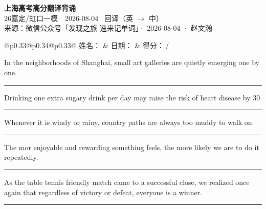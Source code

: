 \documentclass[11pt,a4paper]{article}
\newcommand{\num}[1]{\makebox[1.9em][r]{#1.}\hspace{0.3em}}
\newcommand{\wline}{\noindent\rule{\linewidth}{0.4pt}}
\begin{document}
\pagestyle{plain}
\begin{center}
{\LARGE\bfseries 上海高考高分翻译背诵 }\\[0.25em]
{\large 26嘉定/虹口一模　2026-08-04 \quad\ 回译（英 $\to$ 中）}\\[0.35em]
{\footnotesize 来源：微信公众号「发现之旅 速来记单词」· 2026-08-04 · 赵文瀚}
\end{center}

\vspace{0.4em}
\noindent\begin{tabular}{@{}p{0.33\textwidth}@{}p{0.34\textwidth}@{}p{0.33\textwidth}@{}}
姓名：\underline{\hspace{2.0cm}} & 日期：\underline{\hspace{2.0cm}} & 得分：\underline{\hspace{1.4cm}}\,/ \\
\end{tabular}

\vspace{0.5em}

\vspace{0.8em}
\num{1}In the neighborhoods of Shanghai, small art galleries are quietly emerging one by one.

\vspace{0.25em}

\wline

\num{2}Drinking one extra sugary drink per day may raise the risk of heart disease by 30%

\vspace{0.25em}

\wline

\num{3}Whenever it is windy or rainy, country paths are always too muddy to walk on.

\vspace{0.25em}

\wline

\num{4}The mor enjoyable and rewarding something feels, the more likely we are to do it repeatedly.

\vspace{0.25em}

\wline

\num{5}As the table tennis friendly match came to a successful close, we realized once again that regardless of victory or defeat, everyone is a winner.

\vspace{0.25em}

\wline
\end{document}
